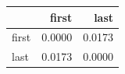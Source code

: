 \begin{tabular}{lrr}
\toprule
 & first & last \\
\midrule
first & 0.0000 & 0.0173 \\
last & 0.0173 & 0.0000 \\
\bottomrule
\end{tabular}
